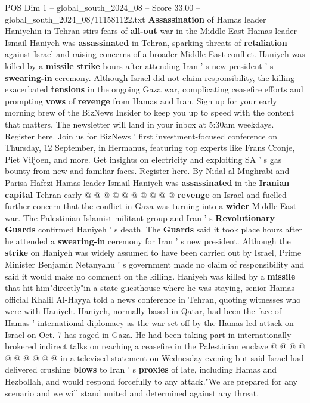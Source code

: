 \begin{textsample}{POS Dim 1 – global\_south\_2024\_08 – Score 33.00 – global\_south\_2024\_08/111581122.txt}  \label{ex:f1_pos_004}
\textbf{Assassination} of Hamas leader Haniyehin in Tehran stirs fears of \textbf{all-out} war in the Middle East Hamas leader Ismail Haniyeh was \textbf{assassinated} in Tehran, sparking threats of \textbf{retaliation} against Israel and raising concerns of a broader Middle East conflict.
Haniyeh was killed by a \textbf{missile} \textbf{strike} hours after attending Iran ' s new president ' s \textbf{swearing-in} ceremony.
Although Israel did not claim responsibility, the killing exacerbated \textbf{tensions} in the ongoing Gaza war, complicating ceasefire efforts and prompting \textbf{vows} of \textbf{revenge} from Hamas and Iran.
Sign up for your early morning brew of the BizNews Insider to keep you up to speed with the content that matters.
The newsletter will land in your inbox at 5:30am weekdays.
Register here.
Join us for BizNews ' first investment-focused conference on Thursday, 12 September, in Hermanus, featuring top experts like Frans Cronje, Piet Viljoen, and more.
Get insights on electricity and exploiting SA ' s gas bounty from new and familiar faces.
Register here.
By Nidal al-Mughrabi and Parisa Hafezi Hamas leader Ismail Haniyeh was \textbf{assassinated} in the \textbf{Iranian} \textbf{capital} Tehran early @ @ @ @ @ @ @ @ @ @ \textbf{revenge} on Israel and fuelled further concern that the conflict in Gaza was turning into a \textbf{wider} Middle East war.
The Palestinian Islamist militant group and Iran ' s \textbf{Revolutionary} \textbf{Guards} confirmed Haniyeh ' s death.
The \textbf{Guards} said it took place hours after he attended a \textbf{swearing-in} ceremony for Iran ' s new president.
Although the \textbf{strike} on Haniyeh was widely assumed to have been carried out by Israel, Prime Minister Benjamin Netanyahu ' s government made no claim of responsibility and said it would make no comment on the killing.
Haniyeh was killed by a \textbf{missile} that hit him"directly"in a state guesthouse where he was staying, senior Hamas official Khalil Al-Hayya told a news conference in Tehran, quoting witnesses who were with Haniyeh.
Haniyeh, normally based in Qatar, had been the face of Hamas ' international diplomacy as the war set off by the Hamas-led attack on Israel on Oct. 7 has raged in Gaza.
He had been taking part in internationally brokered indirect talks on reaching a ceasefire in the Palestinian enclave @ @ @ @ @ @ @ @ @ @ in a televised statement on Wednesday evening but said Israel had delivered crushing \textbf{blows} to Iran ' s \textbf{proxies} of late, including Hamas and Hezbollah, and would respond forcefully to any attack."We are prepared for any scenario and we will stand united and determined against any threat.

\end{textsample}
